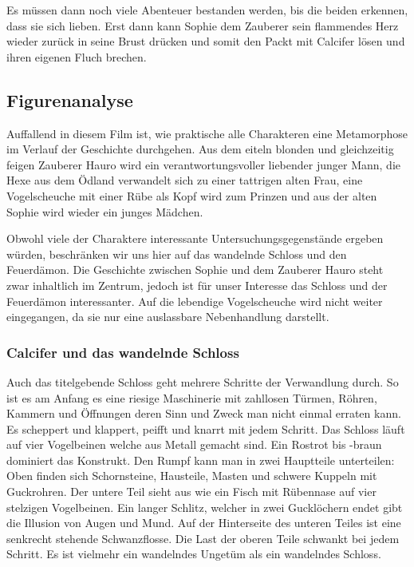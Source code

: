 Es müssen dann noch viele Abenteuer bestanden werden, bis die beiden erkennen, dass sie sich lieben. Erst dann kann Sophie dem Zauberer sein flammendes Herz wieder zurück in seine Brust drücken und somit den Packt mit Calcifer lösen und ihren eigenen Fluch brechen. 

\subsection{Figurenanalyse}
Auffallend in diesem Film ist, wie praktische alle Charakteren eine Metamorphose im Verlauf der Geschichte durchgehen. Aus dem eiteln blonden und gleichzeitig feigen Zauberer Hauro wird ein verantwortungsvoller liebender junger Mann, die Hexe aus dem Ödland verwandelt sich zu einer tattrigen alten Frau, eine Vogelscheuche mit einer Rübe als Kopf wird zum Prinzen und aus der alten Sophie wird wieder ein junges Mädchen.  

Obwohl viele der Charaktere interessante Untersuchungsgegenstände ergeben würden, beschränken wir uns hier auf das wandelnde Schloss und den Feuerdämon. Die Geschichte zwischen Sophie und dem Zauberer Hauro steht zwar inhaltlich im Zentrum, jedoch ist für unser Interesse das Schloss und der Feuerdämon interessanter. Auf die lebendige Vogelscheuche wird nicht weiter eingegangen, da sie nur eine auslassbare Nebenhandlung darstellt.

\subsubsection*{Calcifer und das wandelnde Schloss}
Auch das titelgebende Schloss geht mehrere Schritte der Verwandlung durch. So ist es am Anfang es eine riesige Maschinerie mit zahllosen Türmen, Röhren, Kammern und Öffnungen deren Sinn und Zweck man nicht einmal erraten kann. Es scheppert und klappert, peifft und knarrt mit jedem Schritt. Das Schloss läuft auf vier Vogelbeinen welche aus Metall gemacht sind. Ein Rostrot bis -braun dominiert das Konstrukt. Den Rumpf kann man in zwei Hauptteile unterteilen: Oben finden sich Schornsteine, Hausteile, Masten und schwere Kuppeln mit Guckrohren. Der untere Teil sieht aus wie ein Fisch mit Rübennase auf vier stelzigen Vogelbeinen. Ein langer Schlitz, welcher in zwei Gucklöchern endet gibt die Illusion von Augen und Mund. Auf der Hinterseite des unteren Teiles ist eine senkrecht stehende Schwanzflosse. Die Last der oberen Teile schwankt bei jedem Schritt. Es ist vielmehr ein wandelndes Ungetüm als ein wandelndes Schloss. 

